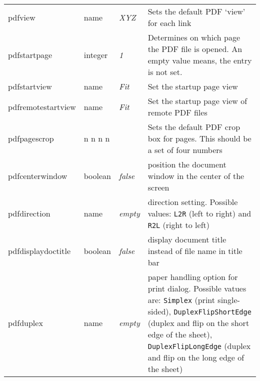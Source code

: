 \documentclass{article}
\begin{document}
\begin{longtable}{@{}>{\ttfamily}l>{\raggedright}p{}>{\itshape}lp{7cm}@{}}
pdfview            & name    & XYZ   & Sets the default PDF `view' for each link \\
pdfstartpage       & integer & 1     & Determines on which page the PDF file is opened. An empty value means, the entry is not set.\\
pdfstartview       & name    & Fit   & Set the startup page view \\
pdfremotestartview & name    & Fit   & Set the startup page view of remote PDF files \\
pdfpagescrop       & n n n n &       & Sets the default PDF crop box for pages. This should be a set of four numbers \\
pdfcenterwindow    & boolean & false & position the document window in the center of the screen \\
pdfdirection       & name    & empty & direction setting. Possible values:  \verb|L2R| (left to right) and
                                       \verb|R2L| (right to left)\\
pdfdisplaydoctitle & boolean & false & display document title instead of file name in title bar\\
pdfduplex          & name    & empty & paper handling option for print dialog. Possible vatues are:
                                       \verb|Simplex| (print single-sided),
                                       \verb|DuplexFlipShortEdge| (duplex and flip on the short edge of the sheet),
                                       \verb|DuplexFlipLongEdge| (duplex and flip on the long edge of the sheet)\\


\end{longtable}
\end{document}
